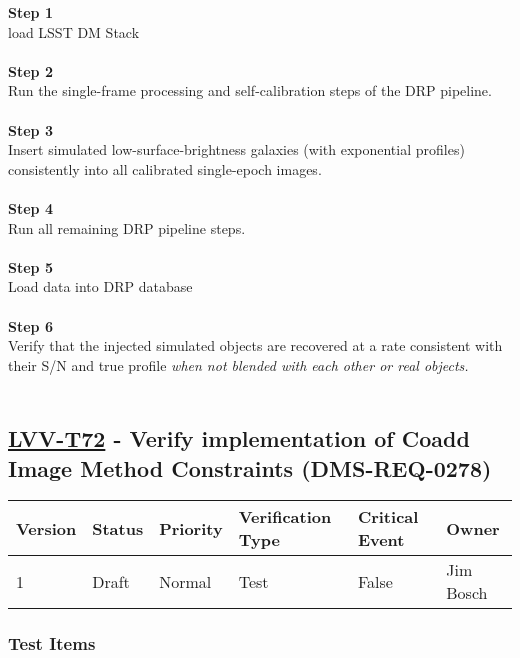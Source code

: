 \textbf{Step 1}\\
load LSST DM Stack\\
~\\
\textbf{Step 2}\\
{}Run the single-frame processing and self-calibration steps of the DRP
pipeline.\\
~\\
\textbf{Step 3}\\
Insert simulated low-surface-brightness galaxies (with exponential
profiles) consistently into all calibrated single-epoch images.\\
~\\
\textbf{Step 4}\\
Run all remaining DRP pipeline steps.\\
~\\
\textbf{Step 5}\\
​​​​Load data into DRP database\\
~\\
\textbf{Step 6}\\
Verify that the injected simulated objects are recovered at a rate
consistent with their S/N and true profile \emph{when not blended with
each other or real objects.}\\
~\\

\hypertarget{lvv-t72---verify-implementation-of-coadd-image-method-constraints-dms-req-0278}{%
\subsection{\texorpdfstring{\href{https://jira.lsstcorp.org/secure/Tests.jspa\#/testCase/LVV-T72}{LVV-T72}
- Verify implementation of Coadd Image Method Constraints
(DMS-REQ-0278)}{LVV-T72 - Verify implementation of Coadd Image Method Constraints (DMS-REQ-0278)}}\label{lvv-t72---verify-implementation-of-coadd-image-method-constraints-dms-req-0278}}

\begin{longtable}[]{@{}llllll@{}}
\toprule
Version & Status & Priority & Verification Type & Critical Event &
Owner\tabularnewline
\midrule
\endhead
1 & Draft & Normal & Test & False & Jim Bosch\tabularnewline
\bottomrule
\end{longtable}

\hypertarget{test-items-48}{%
\subsubsection{Test Items}\label{test-items-48}}

